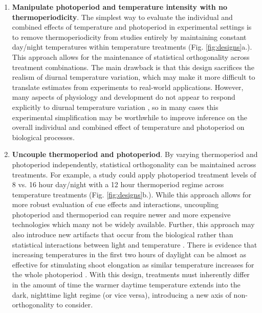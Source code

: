 \documentclass[11pt]{article}
\begin{document}
\begin{enumerate}

\item \textbf{Manipulate photoperiod and temperature intensity with no thermoperiodicity}. The simplest way to evaluate the individual and combined effects of temperature and photoperiod in experimental settings is to remove thermoperiodicity from studies entirely by maintaining constant day/night temperatures within temperature treatments (Fig. \ref{fig:designs}a.). This approach allows for the maintenance of statistical orthogonality across treatment combinations. The main drawback is that this design sacrifices the realism of diurnal temperature variation, which may make it more difficult to translate estimates from experiments to real-world applications. However, many aspects of physiology and development do not appear to respond explicitly to diurnal temperature variation \citep[e.g.,][]{Hellmers:1966wz,Warrington:1977vt,Bhatt:2019uu}, so in many cases this experimental simplification may be worthwhile to improve inference on the overall individual and combined effect of temperature and photoperiod on biological processes.

\item \textbf{Uncouple thermoperiod and photoperiod}. By varying thermoperiod and photoperiod independently, statistical orthogonality can be maintained across treatments. For example, a study could apply photoperiod treatment levels of 8 vs. 16 hour day/night with a 12 hour thermoperiod regime across temperature treatments (Fig. \ref{fig:designs}b.). While this approach allows for more robust evaluation of cue effects and interactions, uncoupling photoperiod and thermoperiod can require newer and more expensive technologies which many not be widely available. Further, this approach may also introduce new artifacts that occur from the biological rather than statistical interactions between light and temperature \citep{Chew:2012wj}. There is evidence that increasing temperatures in the first two hours of daylight can be almost as effective for stimulating shoot elongation as similar temperature increases for the whole photoperiod \citep{Erwin1998}. With this design, treatments must inherently differ in the amount of time the warmer daytime temperature extends into the dark, nighttime light regime (or vice versa), introducing a new axis of non-orthogonality to consider.


\end{enumerate}
\end{document}
